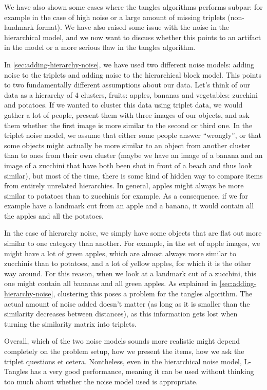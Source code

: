 We have also shown some cases where the tangles algorithms performs subpar: for example in the case of high noise or a large amount of missing triplets (non-landmark format).
We have also raised some issue with the noise in the hierarchical model, and we now want to discuss whether this points to an artifact in the model or a more serious flaw in the tangles
algorithm.

In \autoref{sec:adding-hierarchy-noise}, we have used two different noise models: adding noise to the triplets and adding noise to the hierarchical block model. This points to two fundamentally different
assumptions about our data. Let's think of our data as a hierarchy of 4 clusters, fruits: apples, bananas and vegetables: zucchini and potatoes.
If we wanted to cluster this data using triplet data, we would gather a lot of people, present them with three images of our objects, and ask them whether the first image is more similar to the second or third one.
In the triplet noise model, we assume that either some people answer \enquote{wrongly}, or that some objects might actually be more similar to an object from another cluster than to ones
from their own cluster (maybe we have an image of a banana and an image of a zucchini that have both been shot in front of a beach and thus look similar), but most of the time, there is some kind of 
hidden way to compare items from entirely unrelated hierarchies. In general, apples might always be more similar to potatoes than to zucchinis for example. As a consequence, if we for example have a landmark
cut from an apple and a banana, it would contain all the apples and all the potatoes. 

In the case of hierarchy noise, we simply have some objects that are flat out more similar to one category than another. For example, in the set of apple images, we might have a lot of green apples, which 
are almost always more similar to zucchinis than to potatoes, and a lot of yellow apples, for which it is the other way around. For this reason, when we look at a landmark cut of a zucchini, this one
might contain all bananas and all green apples. As explained in \autoref{sec:adding-hierarchy-noise}, clustering this poses a problem for the tangles algorithm. The actual amount of noise added doesn't matter
(as long as it is smaller than the similarity decreases between distances),  as this information gets lost when turning the similarity matrix into triplets.

Overall, which of the two noise models sounds more realistic might depend completely on the problem setup, how we present the items, how we ask the triplet questions et cetera. Nontheless, even in the
hierarchical noise model, L-Tangles has a very good performance, meaning it can be used without thinking too much about whether the noise model used is appropriate.

